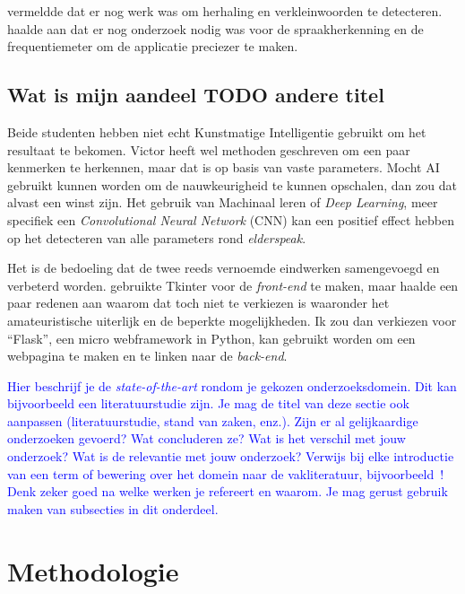 \textcite{Beeckman2021} vermeldde dat er nog werk was om herhaling en verkleinwoorden te detecteren. \textcite{Standaert2021} haalde aan dat er nog onderzoek nodig was voor de spraakherkenning en de frequentiemeter om de applicatie preciezer te maken.

\subsection{Wat is mijn aandeel TODO andere titel}

Beide studenten hebben niet echt Kunstmatige Intelligentie gebruikt om het resultaat te bekomen. Victor heeft wel methoden geschreven om een paar kenmerken te herkennen, maar dat is op basis van vaste parameters.
Mocht AI gebruikt kunnen worden om de nauwkeurigheid te kunnen opschalen, dan zou dat alvast een winst zijn. Het gebruik van Machinaal leren of \textit{Deep Learning}, meer specifiek een \textit{Convolutional Neural Network} (CNN) kan een positief effect hebben op het detecteren van alle parameters rond \textit{elderspeak}.

Het is de bedoeling dat de twee reeds vernoemde eindwerken samengevoegd en verbeterd worden. \textcite{Beeckman2021} gebruikte Tkinter voor de \textit{front-end} te maken, maar haalde een paar redenen aan waarom dat toch niet te verkiezen is waaronder het amateuristische uiterlijk en de beperkte mogelijkheden. Ik zou dan verkiezen voor ``Flask'', een micro webframework in Python, kan gebruikt worden om een webpagina te maken en te linken naar de \textit{back-end}.

\textcolor{blue}{
Hier beschrijf je de \emph{state-of-the-art} rondom je gekozen onderzoeksdomein. Dit kan bijvoorbeeld een literatuurstudie zijn. Je mag de titel van deze sectie ook aanpassen (literatuurstudie, stand van zaken, enz.). Zijn er al gelijkaardige onderzoeken gevoerd? Wat concluderen ze? Wat is het verschil met jouw onderzoek? Wat is de relevantie met jouw onderzoek?
Verwijs bij elke introductie van een term of bewering over het domein naar de vakliteratuur, bijvoorbeeld~\autocite{Doll1954}! Denk zeker goed na welke werken je refereert en waarom.
Je mag gerust gebruik maken van subsecties in dit onderdeel.}

\section{Methodologie}
\label{sec:methodologie}

